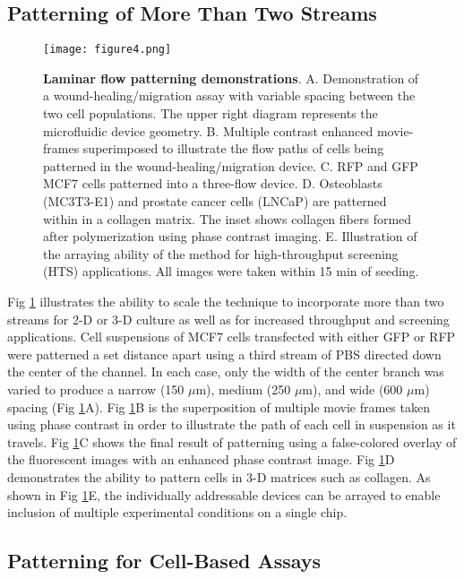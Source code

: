 \subsection{Patterning of More Than Two Streams}
\begin{figure}[!t]
\centering
\texttt{[image: figure4.png]}
  \caption{\textbf{Laminar flow patterning demonstrations}. A. Demonstration of a wound-healing/migration assay with variable spacing between the two cell populations. The upper right diagram represents the microfluidic device geometry. B. Multiple contrast enhanced movie-frames superimposed to illustrate the flow paths of cells being patterned in the wound-healing\slash migration device. C. RFP and GFP MCF7 cells patterned into a three-flow device. D. Osteoblasts (MC3T3-E1) and prostate cancer cells (LNCaP) are patterned within in a collagen matrix. The inset shows collagen fibers formed after polymerization using phase contrast imaging. E. Illustration of the arraying ability of the method for high-throughput screening (HTS) applications. All images  were taken within 15 min of seeding.} 
  \label{fig:experimental2}
\end{figure}

Fig \ref{fig:experimental2} illustrates the ability to scale the technique to incorporate more than two streams for 2-D or 3-D culture as well as for increased throughput and screening applications. Cell suspensions of MCF7 cells transfected with either GFP or RFP were patterned a set distance apart using a third stream of PBS directed down the center of the channel. In each case, only the width of the center branch was varied to produce a narrow (150 $\mu$m), medium (250 $\mu$m), and wide (600 $\mu$m) spacing (Fig \ref{fig:experimental2}A). Fig \ref{fig:experimental2}B is the superposition of multiple movie frames taken using phase contrast in order to illustrate the path of each cell in suspension as it travels. Fig \ref{fig:experimental2}C shows the final result of patterning using a false-colored overlay of the fluorescent images with an enhanced phase contrast image. Fig \ref{fig:experimental2}D demonstrates the ability to pattern cells in 3-D matrices such as collagen. As shown in Fig \ref{fig:experimental2}E, the individually addressable devices can be arrayed to enable inclusion of multiple experimental conditions on a single chip.

\subsection{Patterning for Cell-Based Assays}


